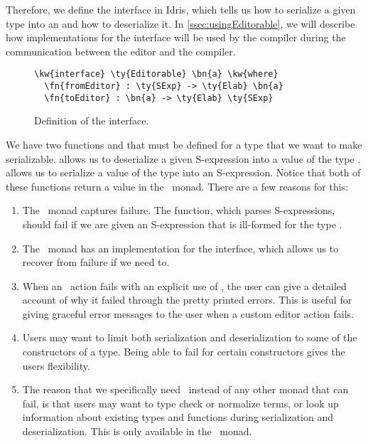 Therefore, we define the interface  in Idris, which tells us
how to serialize a given type into an  and how to deserialize it.
In \autoref{ssec:usingEditorable}, we will describe how implementations for
the  interface will be used by the compiler during the
communication between the editor and the compiler.

\begin{figure}[ht]
\caption{Definition of the  interface.}
\label{code:editorable}
\begin{Verbatim}[framesep=2mm, label=\footnotesize{\normalfont{Idris}}, labelposition=topline]
\kw{interface} \ty{Editorable} \bn{a} \kw{where}
  \fn{fromEditor} : \ty{SExp} -> \ty{Elab} \bn{a}
  \fn{toEditor} : \bn{a} -> \ty{Elab} \ty{SExp}
\end{Verbatim}
\end{figure}

We have two functions  and  that must be defined
for a type that we want to make serializable.
 allows us to deserialize a given S-expression into a value of the type .
 allows us to serialize a value of the type  into an S-expression.
Notice that both of these functions return a value in the \Elab\ monad.
There are a few reasons for this:
\begin{enumerate}
  \item The \Elab\ monad captures failure. The 
    function, which parses S-expressions, should fail if we are
    given an S-expression that is ill-formed for the type .
  \item The \Elab\ monad has an implementation for the 
    interface, which allows us to recover from failure if we need to.
  \item When an \Elab\ action fails with an explicit use of
    ,
    the user can give a detailed account of why it failed through the pretty
    printed errors. This is useful for giving graceful error messages to the
    user when a custom editor action fails.
  \item Users may want to limit both serialization and deserialization
    to some of the constructors of a type. Being able to fail for certain
    constructors gives the users flexibility.
  \item The reason that we specifically need \Elab\ instead of any other monad that can
    fail, is that users may want to type check or normalize terms, or look up
    information about existing types and functions during serialization and
    deserialization. This is only available in the \Elab\ monad.
\end{enumerate}

